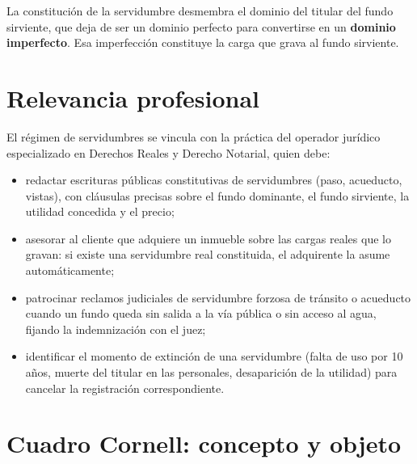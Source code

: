\documentclass[12pt,oneside]{book}
\begin{document}
La constitución de la servidumbre desmembra el dominio del titular del fundo sirviente, que deja de ser un dominio perfecto para convertirse en un \textbf{dominio imperfecto}. Esa imperfección constituye la carga que grava al fundo sirviente.

\section{Relevancia profesional}

\begin{note}
El régimen de servidumbres se vincula con la práctica del operador jurídico especializado en Derechos Reales y Derecho Notarial, quien debe:
\begin{itemize}
    \item redactar escrituras públicas constitutivas de servidumbres (paso, acueducto, vistas), con cláusulas precisas sobre el fundo dominante, el fundo sirviente, la utilidad concedida y el precio;
    \item asesorar al cliente que adquiere un inmueble sobre las cargas reales que lo gravan: si existe una servidumbre real constituida, el adquirente la asume automáticamente;
    \item patrocinar reclamos judiciales de servidumbre forzosa de tránsito o acueducto cuando un fundo queda sin salida a la vía pública o sin acceso al agua, fijando la indemnización con el juez;
    \item identificar el momento de extinción de una servidumbre (falta de uso por 10 años, muerte del titular en las personales, desaparición de la utilidad) para cancelar la registración correspondiente.
\end{itemize}
\end{note}

\section*{Cuadro Cornell: concepto y objeto}
\end{document}
